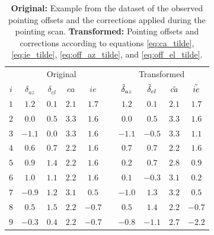 \begin{table}[H]
    \centering
    \caption{\textbf{Original:} Example from the dataset of the observed pointing offsets and the corrections applied during the pointing scan.
    \textbf{Transformed:} Pointing offsets and corrections according to equations \eqref{eq:ca_tilde}, \eqref{eq:ie_tilde}, \eqref{eq:off_az_tilde}, and \eqref{eq:off_el_tilde}.}
    \label{tab:offset_and_corrections}
    \begin{tabular}{c cccc c cccc}
    \toprule
    \multicolumn{1}{c}{} & \multicolumn{4}{c}{Original} & \multicolumn{1}{c}{} & \multicolumn{4}{c}{Transformed} \\
    \cmidrule(lr){2-5} \cmidrule(lr){7-10} 
    $i$ &  $\delta_{az}$ &  $\delta_{el}$ &  $ca$ & $ie$  & & $\Tilde{\delta}_{az}$ &  $\Tilde{\delta}_{el}$ &  $\Tilde{ca}$ &  $\Tilde{ie}$ \\
    \midrule
    $1$ &     $1.2$ & $0.1$ & $2.1$ &  $1.7$ &   &    $1.2$ &       $0.1$ &       $2.1$ &       $1.7$ \\
    $2$ &     $0.0$ & $0.5$ & $3.3$ &  $1.6$ &   &    $0.0$ &       $0.5$ &       $3.3$ &       $1.6$ \\
    $3$ &    $-1.1$ & $0.0$ & $3.3$ &  $1.6$ &   &   $-1.1$ &      $-0.5$ &       $3.3$ &       $1.1$ \\
    $4$ &     $0.6$ & $0.7$ & $2.2$ &  $1.6$ &   &    $0.7$ &       $0.7$ &       $2.2$ &       $1.6$ \\
    $5$ &     $0.9$ & $1.4$ & $2.2$ &  $1.6$ &   &    $0.2$ &       $0.7$ &       $2.8$ &       $0.9$ \\
    $6$ &     $1.0$ & $1.1$ & $2.2$ &  $1.6$ &   &    $0.1$ &      $-0.3$ &       $3.1$ &       $0.2$ \\
    $7$ &    $-0.9$ & $1.2$ & $3.1$ &  $0.5$ &   &   $-1.0$ &       $1.3$ &       $3.2$ &       $0.5$ \\
    $8$ &     $0.5$ & $1.5$ & $2.2$ & $-0.7$ &   &    $0.5$ &       $1.4$ &       $2.2$ &      $-0.7$ \\
    $9$ &    $-0.3$ & $0.4$ & $2.2$ & $-0.7$ &   &   $-0.8$ &      $-1.1$ &       $2.7$ &      $-2.2$ \\
    \bottomrule
    \end{tabular}
\end{table}




